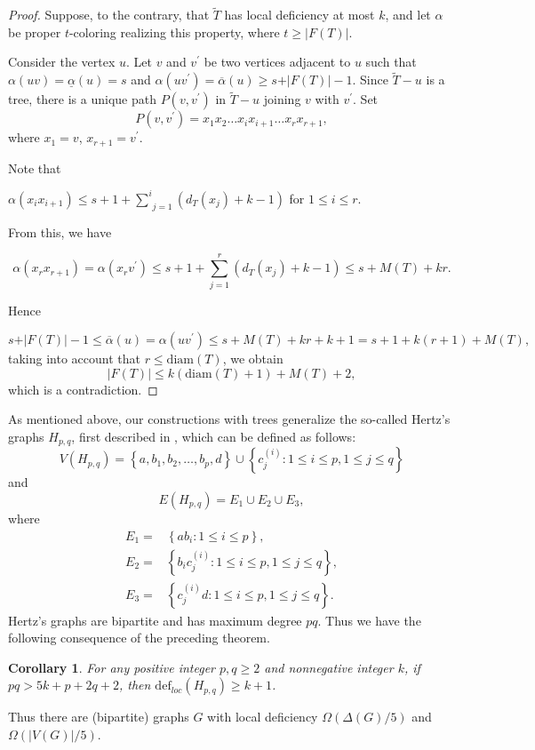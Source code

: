 \documentclass[12pt]{article}
\theoremstyle{plain}
\newtheorem{corollary}[theorem]{Corollary}
\theoremstyle{definition}
\numberwithin{equation}{section}
\begin{document}
\begin{proof}
Suppose, to the contrary, that $\widetilde{T}$ has local deficiency at most $k$, and
let $\alpha$ be proper $t$-coloring realizing this property, where $t\geq \vert F(T)\vert$.

Consider the vertex $u$. Let $v$ and $v^{\prime}$ be two vertices
adjacent to $u$ such that $\alpha(uv)=\underline{\alpha}(u)=s$ and
$\alpha(uv^{\prime})=\overline{\alpha}(u)\geq s+\vert F(T)\vert-1$. Since $\widetilde{T}-u$ is a tree, there is a unique path
$P(v,v^{\prime})$ in $\widetilde{T}-u$ joining $v$ with
$v^{\prime}$. Set
%
$$P(v,v^{\prime})=x_{1}x_{2}\ldots x_{i} x_{i+1}\ldots
x_{r}  x_{r+1},$$ 
%
where $x_{1}=v$, $x_{r+1}=v^{\prime}$.


Note that
\begin{center}
$\alpha(x_{i}x_{i+1})\leq s+1+\underset{j=1}{\overset{i}{\sum
}}(d_{T}(x_{j})+k-1)$ for $1\leq i\leq r$.
\end{center}

From this, we have


$$\alpha(x_{r}x_{r+1})=\alpha(x_{r}v^{\prime})\leq
s+1+\underset{j=1}{\overset{r}{\sum
}}(d_{T}(x_{j})+k-1)\leq s+M(T)+kr.$$


Hence

$$s+\vert F(T)\vert-1\leq \overline{\alpha}(u)=\alpha(uv^{\prime})\leq
s+M(T)+kr+k+1=s+1+k(r+1)+M(T),$$ 
taking into account that $r\leq \mathrm{diam}(T)$, we obtain 
$$\vert F(T)\vert\leq k(\mathrm{diam}(T)+1)+M(T)+2,$$
which is a contradiction. 
\end{proof}

As mentioned above,
our constructions with trees generalize the so-called
Hertz's graphs $H_{p,q}$, first described in
\cite{GiaroKubaleMalaf1}, which can be defined as
follows:
$$V(H_{p,q})=\left\{a,b_{1},b_{2},\ldots,b_{p},d\right\}\cup
\left\{c_{j}^{(i)}:1\leq i\leq p, 1\leq j\leq q\right\}$$ and
$$E(H_{p,q})=E_{1}\cup E_{2}\cup E_{3},$$
where
\begin{align*}
E_{1}= & \left\{ab_{i}:1\leq i\leq p\right\}, \\
E_{2}= & \left\{b_{i}c_{j}^{(i)}:1\leq i\leq p, 1\leq j\leq  
q\right\}, \\
E_{3}= & \left\{c_{j}^{(i)}d:1\leq i\leq p, 1\leq j\leq q
\right\}.
\end{align*}
Hertz's graphs are bipartite and has maximum degree $pq$.
Thus we have the following consequence of the preceding theorem.

\begin{corollary}
\label{Hertz graphs} For any positive integer $p,q\geq 2$ and  nonnegative integer $k$, if $pq>5k+p+2q+2$, then $\mathrm{def}_{loc}(H_{p,q})\geq k+1$.
\end{corollary}
Thus there are (bipartite) graphs $G$ with local deficiency $\Omega(\Delta(G) /5)$ and $\Omega(|V(G)|/5)$.
\end{document}
